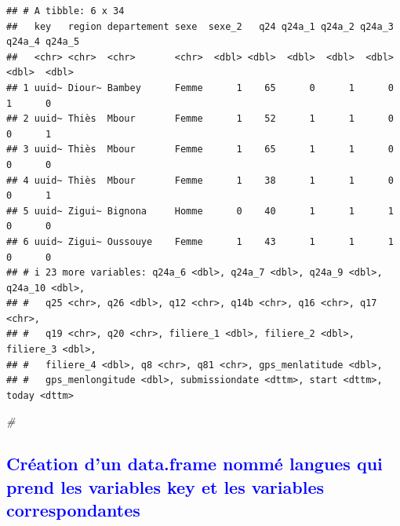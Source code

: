 \documentclass[
]{article}
\newenvironment{Shaded}{\begin{snugshade}}{\end{snugshade}}
\newcommand{\CommentTok}[1]{\textcolor[rgb]{0.56,0.35,0.01}{\textit{#1}}}
\begin{document}
\begin{verbatim}
## # A tibble: 6 x 34
##   key   region departement sexe  sexe_2   q24 q24a_1 q24a_2 q24a_3 q24a_4 q24a_5
##   <chr> <chr>  <chr>       <chr>  <dbl> <dbl>  <dbl>  <dbl>  <dbl>  <dbl>  <dbl>
## 1 uuid~ Diour~ Bambey      Femme      1    65      0      1      0      1      0
## 2 uuid~ Thiès  Mbour       Femme      1    52      1      1      0      0      1
## 3 uuid~ Thiès  Mbour       Femme      1    65      1      1      0      0      0
## 4 uuid~ Thiès  Mbour       Femme      1    38      1      1      0      0      1
## 5 uuid~ Zigui~ Bignona     Homme      0    40      1      1      1      0      0
## 6 uuid~ Zigui~ Oussouye    Femme      1    43      1      1      1      0      0
## # i 23 more variables: q24a_6 <dbl>, q24a_7 <dbl>, q24a_9 <dbl>, q24a_10 <dbl>,
## #   q25 <chr>, q26 <dbl>, q12 <chr>, q14b <chr>, q16 <chr>, q17 <chr>,
## #   q19 <chr>, q20 <chr>, filiere_1 <dbl>, filiere_2 <dbl>, filiere_3 <dbl>,
## #   filiere_4 <dbl>, q8 <chr>, q81 <chr>, gps_menlatitude <dbl>,
## #   gps_menlongitude <dbl>, submissiondate <dttm>, start <dttm>, today <dttm>
\end{verbatim}

\begin{Shaded}
\begin{Highlighting}[]
\CommentTok{\#}
\end{Highlighting}
\end{Shaded}

\textcolor{blue}{\subsection{Création d’un data.frame nommé langues qui prend les variables key et les variables correspondantes}}
\end{document}
